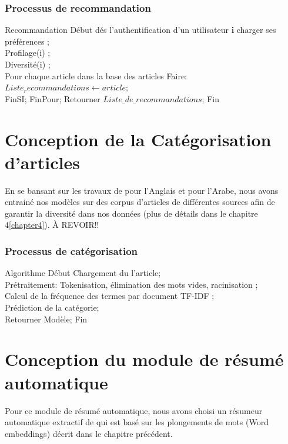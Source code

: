 \subsubsection{Processus de recommandation}
\begin{algorithm}[H]
	\begin{algorithmic}[1]
		\STATE Recommandation
		\STATE Début
		\STATE dés l'authentification d'un utilisateur \textbf{i} charger ses préférences ;\\
		\STATE Profilage(i) ;\\
		\STATE Diversité(i) ;\\
		\STATE Pour chaque article dans la base des articles Faire:
		$Liste_recommandations \gets article$;\\
		\STATE FinSI;
		\STATE FinPour;
		\STATE \quad Retourner $Liste\_de\_recommandations$;
		\STATE Fin
	\end{algorithmic}
\end{algorithm}

\section{Conception de la Catégorisation d'articles}
En se bansant sur les travaux de \cite{categorisation} pour l'Anglais et \cite{categorisation} pour l'Arabe, nous avons entrainé nos modèles sur des corpus d'articles de différentes sources afin de garantir la diversité dans nos données (plus de détails dans le chapitre 4\ref{chapter4}).
À REVOIR!!
\subsubsection{Processus de catégorisation}
    \begin{algorithm}[H]
        \begin{algorithmic}[1]
        \STATE Algorithme
        \STATE Début
        \STATE Chargement du l'article;\\
        \STATE Prétraitement: Tokenisation, élimination des mots vides, racinisation ;\\
        \STATE Calcul de la fréquence des termes par document TF-IDF ;\\
        \STATE Prédiction de la catégorie;\\
        \STATE \quad Retourner Modèle;
        \STATE Fin
        \end{algorithmic}
    \end{algorithm}


\section{Conception du module de résumé automatique}
Pour ce module de résumé automatique, nous avons choisi un résumeur automatique extractif de \cite{notrerésumé} qui est basé sur les plongements de mots (Word embeddings) décrit dans le chapitre précédent.

